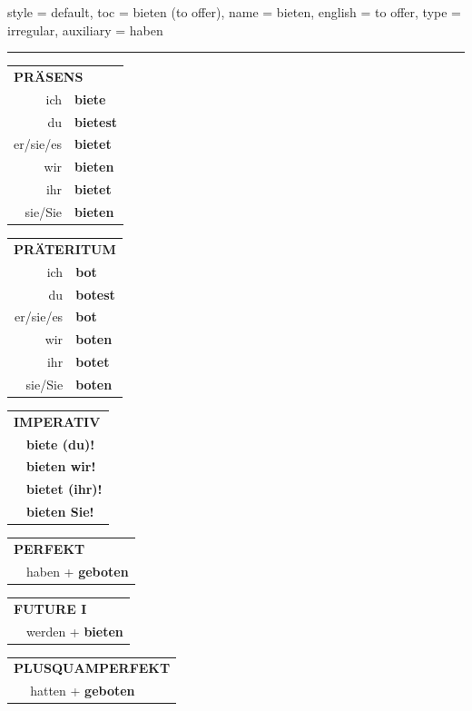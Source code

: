 \begin{verbentry}{
  style = {default},
  toc = {bieten (to offer)},
  name = {bieten},
  english = {to offer},
  type = {irregular},
  auxiliary = {haben}
}


\vspace{5pt}
\hrule
\vspace{5pt}

\begin{tabular}{rl}
\multicolumn{2}{l}{\textbf{PRÄSENS}}\\
ich & \textbf{biete}\\
du & \textbf{bietest}\\
er/sie/es & \textbf{bietet}\\
wir & \textbf{bieten}\\
ihr & \textbf{bietet}\\
sie/Sie & \textbf{bieten}\\
\end{tabular}
\hfill
\begin{tabular}{rl}
\multicolumn{2}{l}{\textbf{PRÄTERITUM}}\\
ich & \textbf{bot}\\
du & \textbf{botest}\\
er/sie/es & \textbf{bot}\\
wir & \textbf{boten}\\
ihr & \textbf{botet}\\
sie/Sie & \textbf{boten}\\
\end{tabular}
\hfill
\begin{tabular}{rl}
\multicolumn{2}{l}{\textbf{IMPERATIV}}\\
& \textbf{biete (du)!}\\
& \textbf{bieten wir!}\\
& \textbf{bietet (ihr)!}\\
& \textbf{bieten Sie!}\\
\end{tabular}

\vspace{10pt}

\begin{tabular}{rl}
\multicolumn{2}{l}{\textbf{PERFEKT}}\\
& haben + \textbf{geboten}\\
\end{tabular}
\hfill
\begin{tabular}{rl}
\multicolumn{2}{l}{\textbf{FUTURE I}}\\
& werden + \textbf{bieten}\\
\end{tabular}
\hfill
\begin{tabular}{rl}
\multicolumn{2}{l}{\textbf{PLUSQUAMPERFEKT}}\\
& hatten + \textbf{geboten}\\
\end{tabular}


\end{verbentry}
